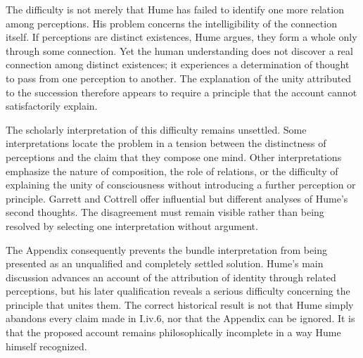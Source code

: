 \label{para:VS.B01.P01.C08.S09.SS08.P002}

The difficulty is not merely that Hume has failed
to identify one more relation among perceptions.
His problem concerns the intelligibility of the
connection itself. If perceptions are distinct
existences, Hume argues, they form a whole only
through some connection. Yet the human understanding
does not discover a real connection among distinct
existences; it experiences a determination of
thought to pass from one perception to another.
The explanation of the unity attributed to the
succession therefore appears to require a principle
that the account cannot satisfactorily explain.

\label{para:VS.B01.P01.C08.S09.SS08.P003}

The scholarly interpretation of this difficulty
remains unsettled. Some interpretations locate
the problem in a tension between the distinctness
of perceptions and the claim that they compose
one mind. Other interpretations emphasize the
nature of composition, the role of relations,
or the difficulty of explaining the unity of
consciousness without introducing a further
perception or principle. Garrett and Cottrell
offer influential but different analyses of
Hume's second thoughts. The disagreement must
remain visible rather than being resolved by
selecting one interpretation without argument.
\cite{Garrett1981,Cottrell2015,QuRadcliffeHume2026}

\label{para:VS.B01.P01.C08.S09.SS08.P004}

The Appendix consequently prevents the bundle
interpretation from being presented as an
unqualified and completely settled solution.
Hume's main discussion advances an account of
the attribution of identity through related
perceptions, but his later qualification reveals
a serious difficulty concerning the principle
that unites them. The correct historical result
is not that Hume simply abandons every claim
made in I.iv.6, nor that the Appendix can be
ignored. It is that the proposed account remains
philosophically incomplete in a way Hume himself
recognized.




